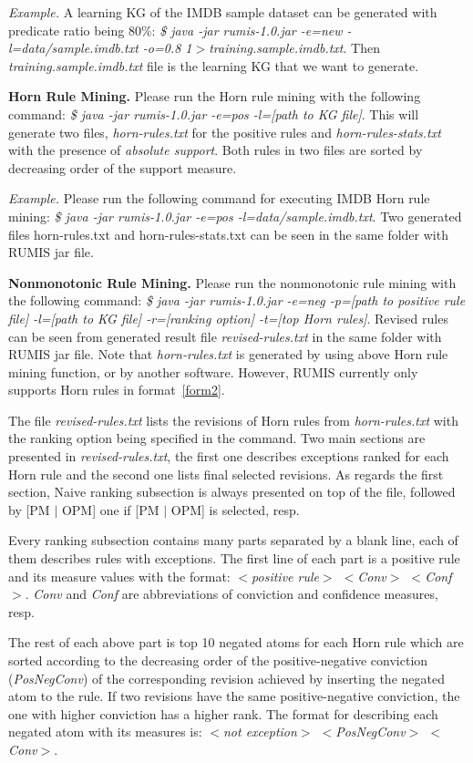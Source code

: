 \textit{Example.} A learning KG of the IMDB sample dataset can be generated with predicate ratio being 80\%: \textit{\$ java -jar rumis-1.0.jar -e=new -l=data/sample.imdb.txt -o=0.8 1$>$training.sample.imdb.txt}. Then \textit{training.sample.imdb.txt} file is the learning KG that we want to generate.

\textbf{Horn Rule Mining.} Please run the Horn rule mining with the following command: \textit{\$ java -jar rumis-1.0.jar -e=pos -l=[path to KG file]}. This will generate two files, \textit{horn-rules.txt} for the positive rules and \textit{horn-rules-stats.txt} with the presence of \textit{absolute support}. Both rules in two files are sorted by decreasing order of the support measure.

\textit{Example.} Please run the following command for executing IMDB Horn rule mining: \textit{\$ java -jar rumis-1.0.jar -e=pos -l=data/sample.imdb.txt}. Two generated files horn-rules.txt and horn-rules-stats.txt can be seen in the same folder with RUMIS jar file.

\textbf{Nonmonotonic Rule Mining.} Please run the nonmonotonic rule mining with the following command: \textit{\$ java -jar rumis-1.0.jar -e=neg -p=[path to positive rule file] -l=[path to KG file] -r=[ranking option] -t=[top Horn rules]}. Revised rules can be seen from generated result file \textit{revised-rules.txt} in the same folder with RUMIS jar file. Note that \textit{horn-rules.txt} is generated by using above Horn rule mining function, or by another software. However, RUMIS currently only supports Horn rules in format~\ref{form2}.

The file \textit{revised-rules.txt} lists the revisions of Horn rules from \textit{horn-rules.txt} with the ranking option being specified in the command. Two main sections are presented in \textit{revised-rules.txt}, the first one describes exceptions ranked for each Horn rule and the second one lists final selected revisions. As regards the first section, Naive ranking subsection is always presented on top of the file, followed by [PM $|$ OPM] one if [PM $|$ OPM] is selected, resp.

Every ranking subsection contains many parts separated by a blank line, each of them describes rules with exceptions. The first line of each part is a positive rule and its measure values with the format: \textit{$<$positive rule$>$ $<$Conv$>$ $<$Conf$>$}. \textit{Conv} and \textit{Conf} are abbreviations of conviction and confidence measures, resp.

The rest of each above part is top 10 negated atoms for each Horn rule which are sorted according to the decreasing order of the positive-negative conviction (\textit{PosNegConv}) of the corresponding revision achieved by inserting the negated atom to the rule. If two revisions have the same positive-negative conviction, the one with higher conviction has a higher rank. The format for describing each negated atom with its measures is: \textit{$<$not exception$>$ $<$PosNegConv$>$ $<$Conv$>$}.

